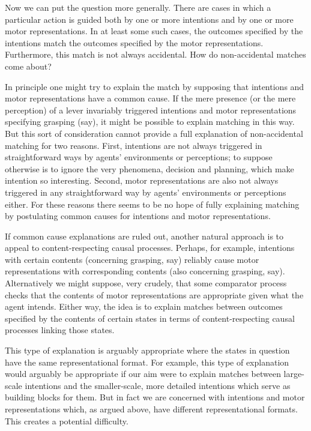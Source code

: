 \documentclass[12pt,\papersize]{extarticle}
\begin{document}
Now we can put the question more generally. There are cases in which a particular action is guided both by one or more intentions and by one or more motor representations. In at least some such cases, the outcomes specified by the intentions match the outcomes specified by the motor representations. Furthermore, this match is not always accidental. How do non-accidental matches come about?  

In principle one might try to explain the match by supposing that intentions and motor representations have a common cause. If the mere presence (or the mere perception) of a lever invariably triggered intentions and motor representations specifying grasping (say), it might be possible to explain matching in this way. But this sort of consideration cannot provide a full explanation of non-accidental matching for two reasons. First, intentions are not always triggered in straightforward ways by agents' environments or perceptions; to suppose otherwise is to ignore the very phenomena, decision and planning, which make intention so interesting.  Second, motor representations are also not always triggered in any straightforward way by agents' environments or perceptions either.  For these reasons there seems to be no hope of fully explaining matching by postulating common causes for intentions and motor representations.

If common cause explanations are ruled out, another natural approach is to  appeal to content-respecting causal processes. Perhaps, for example, intentions with certain contents (concerning grasping, say) reliably cause motor representations with corresponding contents (also concerning grasping, say). Alternatively we might suppose, very crudely, that some comparator process checks that the contents of motor representations are appropriate given what the agent intends.  Either way, the idea is to explain matches between outcomes specified by the contents of certain states in terms of content-respecting causal processes linking those states. 

This type of explanation is arguably appropriate where the states in question have the same representational format.  For example, this type of explanation would arguably be appropriate if our aim were to explain matches between  large-scale intentions and the smaller-scale, more detailed intentions which serve as building blocks for them. But in fact we are concerned with intentions and motor representations which, as argued above, have different representational formats. This creates a potential difficulty.
\end{document}
